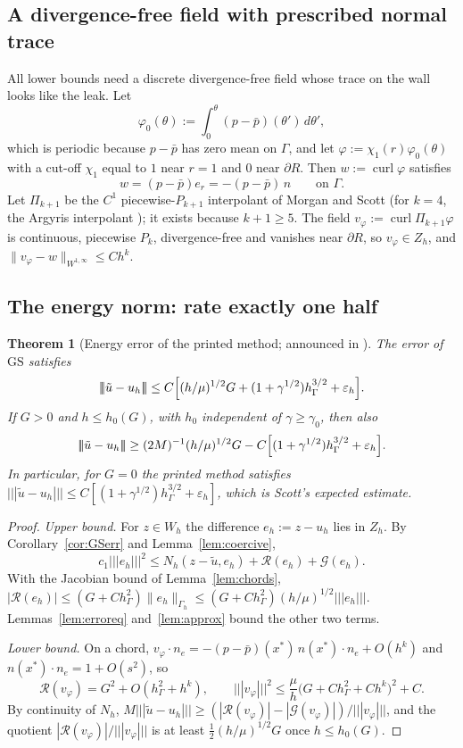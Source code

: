 \documentclass[pdflatex,sn-mathphys-num]{sn-jnl}
\theoremstyle{thmstyleone}
\newtheorem{theorem}{Theorem}[section]
\theoremstyle{thmstylethree}
\newcommand{\hG}{h_\Gamma}
\newcommand{\Gh}{\Gamma_h}
\newcommand{\Zh}{Z_h}
\newcommand{\Wh}{W_h}
\newcommand{\ut}{\tilde u}
\newcommand{\pbar}{\bar p}
\newcommand{\tnorm}[1]{|\!|\!|#1|\!|\!|}
\newcommand{\norm}[1]{\lVert #1\rVert}
\newcommand{\GS}{\mathrm{GS}}
\newcommand{\eps}{\varepsilon_h}
\newcommand{\curl}{\operatorname{curl}}
\newcommand{\Rc}{\mathcal R}
\newcommand{\Gc}{\mathcal G}
\begin{document}
\subsection{A divergence-free field with prescribed normal trace}
All lower bounds need a discrete divergence-free field whose trace on the wall looks like the leak. Let
\[
\varphi_0(\theta):=\int_0^\theta(p-\pbar)(\theta')\,d\theta',
\]
which is periodic because $p-\pbar$ has zero mean on $\Gamma$, and let $\varphi:=\chi_1(r)\varphi_0(\theta)$ with a cut-off $\chi_1$ equal to $1$ near $r=1$ and $0$ near $\partial R$. Then $w:=\curl\varphi$ satisfies
\[
w=(p-\pbar)e_r=-(p-\pbar)\,n\qquad\text{on }\Gamma .
\]
Let $\Pi_{k+1}$ be the $C^1$ piecewise-$P_{k+1}$ interpolant of Morgan and Scott \cite{MorganScott1975} (for $k=4$, the Argyris interpolant \cite{Argyris1968}); it exists because $k+1\ge5$. The field $v_\varphi:=\curl\Pi_{k+1}\varphi$ is continuous, piecewise $P_k$, divergence-free and vanishes near $\partial R$, so $v_\varphi\in\Zh$, and $\norm{v_\varphi-w}_{W^{1,\infty}}\le Ch^k$.

\subsection{The energy norm: rate exactly one half}

\begin{theorem}[Energy error of the printed method; announced in {\cite{CavalcantePadhiLetter}}]\label{thm:A}
The error of $\GS$ satisfies
\[
\tnorm{\ut-u_h}\le C\Bigl[(h/\mu)^{1/2}G+(1+\gamma^{1/2})\hG^{3/2}+\eps\Bigr].
\]
If $G>0$ and $h\le h_0(G)$, with $h_0$ independent of $\gamma\ge\gamma_0$, then also
\[
\tnorm{\ut-u_h}\ge(2M)^{-1}(h/\mu)^{1/2}G-C\Bigl[(1+\gamma^{1/2})\hG^{3/2}+\eps\Bigr].
\]
In particular, for $G=0$ the printed method satisfies $\tnorm{\ut-u_h}\le C[(1+\gamma^{1/2})\hG^{3/2}+\eps]$, which is Scott's expected estimate.
\end{theorem}

\begin{proof}
\emph{Upper bound.} For $z\in\Wh$ the difference $e_h:=z-u_h$ lies in $\Zh$. By Corollary~\ref{cor:GSerr} and Lemma~\ref{lem:coercive},
\[
c_1\tnorm{e_h}^2\le N_h(z-\ut,e_h)+\Rc(e_h)+\Gc(e_h).
\]
With the Jacobian bound of Lemma~\ref{lem:chords}, $|\Rc(e_h)|\le(G+C\hG^2)\norm{e_h}_{\Gh}\le(G+C\hG^2)(h/\mu)^{1/2}\tnorm{e_h}$. Lemmas~\ref{lem:erroreq} and~\ref{lem:approx} bound the other two terms.

\emph{Lower bound.} On a chord, $v_\varphi\cdot n_e=-(p-\pbar)(x^\ast)\,n(x^\ast)\cdot n_e+O(h^k)$ and $n(x^\ast)\cdot n_e=1+O(s^2)$, so
\[
\Rc(v_\varphi)=G^2+O(\hG^2+h^k),\qquad \tnorm{v_\varphi}^2\le\frac\mu h\bigl(G+C\hG^2+Ch^k\bigr)^2+C .
\]
By continuity of $N_h$, $M\tnorm{\ut-u_h}\ge(|\Rc(v_\varphi)|-|\Gc(v_\varphi)|)/\tnorm{v_\varphi}$, and the quotient $|\Rc(v_\varphi)|/\tnorm{v_\varphi}$ is at least $\frac12(h/\mu)^{1/2}G$ once $h\le h_0(G)$.
\end{proof}
\end{document}
